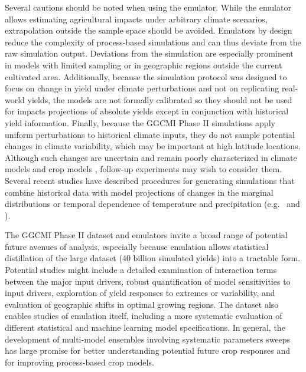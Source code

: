 \documentclass[gmd, manuscript]{copernicus} %
\begin{document}
Several cautions should be noted when using the emulator. 
While the emulator allows estimating agricultural impacts under arbitrary climate scenarios, extrapolation outside the sample space should be avoided. 
Emulators by design reduce the complexity of process-based simulations and can thus deviate from the raw simulation output. 
Deviations from the simulation are especially prominent in models with limited sampling or in geographic regions outside the current cultivated area.
Additionally, because the simulation protocol was designed to focus on change in yield under climate perturbations and not on replicating real-world yields, the models are not formally calibrated so they should not be used for impacts projections of absolute yields except in conjunction with historical yield information. 
Finally, because the GGCMI Phase II simulations apply uniform perturbations to historical climate inputs, they do not sample potential changes in climate variability, which may be important at high latitude locations.
Although such changes are uncertain and remain poorly characterized in climate models and crop models \citep[e.g.][]{Alexande2006, Kodra2014}, follow-up experiments may wish to consider them. 
Several recent studies have described procedures for generating simulations that combine historical data with model projections of changes in the marginal distributions or temporal dependence of temperature and precipitation (e.g.\ \citet{Leeds2015, poppick2016, Won16} and \citet{Haugen2018}).

The GGCMI Phase II dataset and emulators invite a broad range of potential future avenues of analysis, especially because emulation allows statistical distillation of the large dataset (40 billion simulated yields) into a tractable form. 
Potential studies might include a detailed examination of interaction terms between the major input drivers, robust quantification of model sensitivities to input drivers, exploration of yield responses to extremes or variability, and evaluation of geographic shifts in optimal growing regions. 
The dataset also enables studies of emulation itself, including a more systematic evaluation of different statistical and machine learning model specifications.
In general, the development of multi-model ensembles involving systematic parameters sweeps has large promise for better understanding potential future crop responses and for improving process-based crop models.

\end{document}
